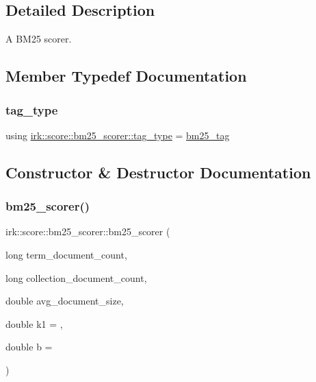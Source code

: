\subsection{Detailed Description}
A B\+M25 scorer. 

\subsection{Member Typedef Documentation}
\mbox{\label{structirk_1_1score_1_1bm25__scorer_ab99e02fc9ede9441ad9ee7a99077a720}} 
\subsubsection{\texorpdfstring{tag\+\_\+type}{tag\_type}}
{\footnotesize\ttfamily using \mbox{\hyperlink{structirk_1_1score_1_1bm25__scorer_ab99e02fc9ede9441ad9ee7a99077a720}{irk\+::score\+::bm25\+\_\+scorer\+::tag\+\_\+type}} =  \mbox{\hyperlink{structirk_1_1score_1_1bm25__tag}{bm25\+\_\+tag}}}



\subsection{Constructor \& Destructor Documentation}
\mbox{\label{structirk_1_1score_1_1bm25__scorer_ab9150dc6a3574f9e5b67c5b0637fee26}} 
\subsubsection{\texorpdfstring{bm25\+\_\+scorer()}{bm25\_scorer()}}
{\footnotesize\ttfamily irk\+::score\+::bm25\+\_\+scorer\+::bm25\+\_\+scorer (\begin{DoxyParamCaption}\item[{long}]{term\+\_\+document\+\_\+count,  }\item[{long}]{collection\+\_\+document\+\_\+count,  }\item[{double}]{avg\+\_\+document\+\_\+size,  }\item[{double}]{k1 = {},  }\item[{double}]{b = {} }\end{DoxyParamCaption})\hspace{0.3cm}{\ttfamily [inline]}}



